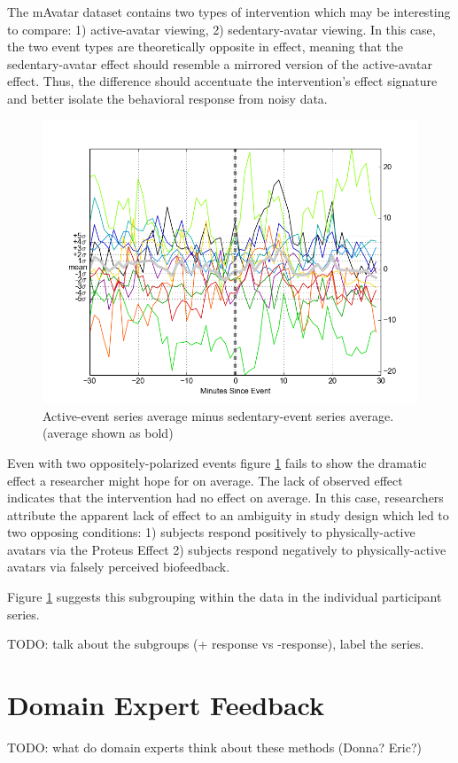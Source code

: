 \documentclass[review,journal]{vgtc}         %
\begin{document}
The mAvatar dataset contains two types of intervention which may be interesting to compare: 1) active-avatar viewing, 2) sedentary-avatar viewing.
In this case, the two event types are theoretically opposite in effect, meaning that the sedentary-avatar effect should resemble a mirrored version of the active-avatar effect.
Thus, the difference should accentuate the intervention's effect signature and better isolate the behavioral response from noisy data.

\begin{figure}
\centering
\includegraphics[width=0.9\columnwidth]{./img/mAvatar_difference_events.png}
\caption{Active-event series average minus sedentary-event series average. (average shown as bold)}
\label{fig:mAvatarDifference}
\end{figure}

Even with two oppositely-polarized events figure \ref{fig:mAvatarDifference} fails to show the dramatic effect a researcher might hope for on average.
The lack of observed effect indicates that the intervention had no effect on average.
In this case, researchers attribute the apparent lack of effect to an ambiguity in study design which led to two opposing conditions: 1) subjects respond positively to physically-active avatars via the Proteus Effect \cite{???} 2) subjects respond negatively to physically-active avatars via falsely perceived biofeedback.

Figure \ref{fig:mAvatarDifference} suggests this subgrouping within the data in the individual participant series.

TODO: talk about the subgroups (+ response vs -response), label the series.

\section{Domain Expert Feedback}
TODO: what do domain experts think about these methods (Donna? Eric?)
\end{document}
